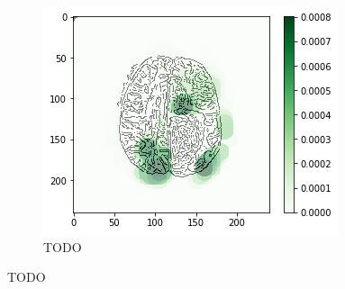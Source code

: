 \begin{figure}[H]
\begin{subfigure}{.33\textwidth}
        \includegraphics[width=\linewidth]{chapters/06_hdm/circle20/14.png}
        \caption{TODO}
    \end{subfigure}
    \caption{TODO}
\end{figure}


